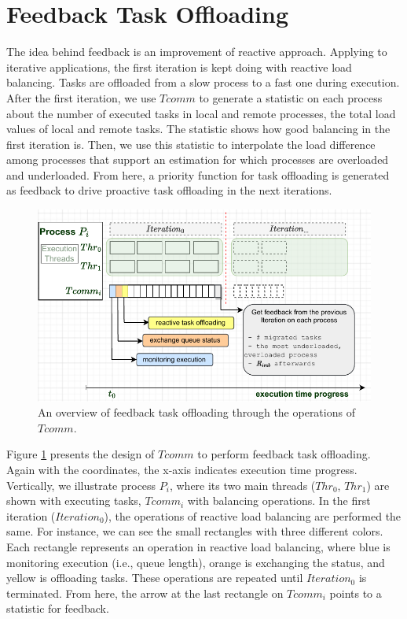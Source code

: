 \section{Feedback Task Offloading}
\label{sec:PADLB-FeedbackLB}

The idea behind feedback is an improvement of reactive approach. Applying to iterative applications, the first iteration is kept doing with reactive load balancing. Tasks are offloaded from a slow process to a fast one during execution. After the first iteration, we use $Tcomm$ to generate a statistic on each process about the number of executed tasks in local and remote processes, the total load values of local and remote tasks. The statistic shows how good balancing in the first iteration is. Then, we use this statistic to interpolate the load difference among processes that support an estimation for which processes are overloaded and underloaded. From here, a priority function for task offloading is generated as feedback to drive proactive task offloading in the next iterations.\\

\begin{figure}[t]
	\centering
	\includegraphics[scale=0.65]{./pictures/padlb_approach/padlb_feedback_lb_idea.pdf}
	\caption{An overview of feedback task offloading through the operations of $Tcomm$.}
	\label{fig:padlb_feedback_task_offloading}
\end{figure}

Figure \ref{fig:padlb_feedback_task_offloading} presents the design of $Tcomm$ to perform feedback task offloading. Again with the coordinates, the x-axis indicates execution time progress. Vertically, we illustrate process $P_{i}$, where its two main threads ($Thr_{0}$, $Thr_{1}$) are shown with executing tasks, $Tcomm_{i}$ with balancing operations. In the first iteration ($Iteration_{0}$), the operations of reactive load balancing are performed the same. For instance, we can see the small rectangles with three different colors. Each rectangle represents an operation in reactive load balancing, where blue is monitoring execution (i.e., queue length), orange is exchanging the status, and yellow is offloading tasks. These operations are repeated until $Iteration_{0}$ is terminated. From here, the arrow at the last rectangle on $Tcomm_{i}$ points to a statistic for feedback.\\

